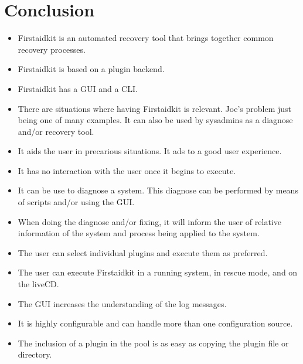 \documentclass[a4paper,13pt]{article}
\begin{document}
\section{Conclusion}
\begin{itemize}
\item Firstaidkit is an automated recovery tool that brings together common recovery processes.
\item Firstaidkit is based on a plugin backend.
\item Firstaidkit has a GUI and a CLI.
\item There are situations where having Firstaidkit is relevant.  Joe's problem just being one of many examples.  It can also be used by sysadmins as a diagnose and/or recovery tool.
\item It aids the user in precarious situations.  It ads to a good user experience.
\item It has no interaction with the user once it begins to execute.
\item It can be use to diagnose a system.  This diagnose can be performed by means of scripts and/or using the GUI.
\item When doing the diagnose and/or fixing, it will inform the user of relative information of the system and process being applied to the system.
\item The user can select individual plugins and execute them as preferred.
\item The user can execute Firstaidkit in a running system, in rescue mode, and on the liveCD.
\item The GUI increases the understanding of the log messages.
\item It is highly configurable and can handle more than one configuration source.
\item The inclusion of a plugin in the pool is as easy as copying the plugin file or directory.
\end{itemize}
\end{document}
